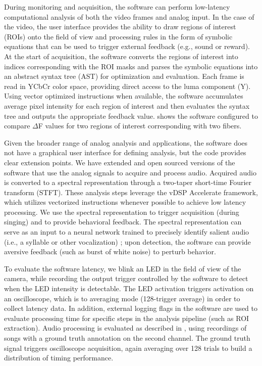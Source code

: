 During monitoring and acquisition, the software can perform low-latency
computational analysis of both the video frames and analog input. In 
the case of the video, the user interface provides the ability to 
draw regions of interest (ROIs) onto the field of view and processing 
rules in the form of symbolic equations that can be used to trigger 
external feedback (e.g., sound or reward). At the start of
acquisition, the software converts the regions of interest into indices 
corresponding with the ROI masks and parses the symbolic equations 
into an abstract syntax tree (AST) for optimization and evaluation. 
Each frame is read in YCbCr color 
space, providing direct access to the luma component (Y). Using vector
optimized instructions when available, the software accumulates average 
pixel intensity for each region of interest and then evaluates the 
syntax tree and outputs the appropriate feedback value.  
shows the software configured to compare $\Delta$F values for two 
regions of interest corresponding with two fibers.

Given the broader range of analog analysis and applications, 
the software does not have a graphical 
user interface for defining analysis, but the code provides clear 
extension points. We have extended and open sourced versions 
of the software that use the analog signals to acquire and process 
audio. Acquired audio is converted to a spectral representation 
through a two-taper short-time Fourier transform (STFT). These 
analysis steps leverage the vDSP Accelerate framework, which 
utilizes vectorized instructions whenever possible to achieve 
low latency processing. We use the spectral representation to 
trigger acquisition (during singing) and to provide behavioral
feedback. The spectral 
representation can serve as an input to a neural network trained 
to precisely identify salient audio (i.e., a syllable or other 
vocalization) \cite{Pearre:2017cs}; upon detection, the software 
can provide aversive feedback (such as burst of white noise) 
to perturb behavior.

To evaluate the software latency, we blink an LED in the 
field of view of the camera, while recording the output trigger 
controlled by the software to detect when the LED intensity is 
detectable. The LED activation triggers activation on an 
oscilloscope, which is to averaging mode (128-trigger average) 
in order to collect latency data. In addition, external logging
flags in the software are used to evaluate processing time for 
specific steps in the analysis pipeline (such as ROI extraction).
Audio processing is evaluated as described in \cite{Pearre:2017cs},
using recordings of songs with a ground truth annotation on the 
second channel. The ground truth signal triggers oscilloscope 
acquisition, again averaging over 128 trials to build a distribution 
of timing performance.

